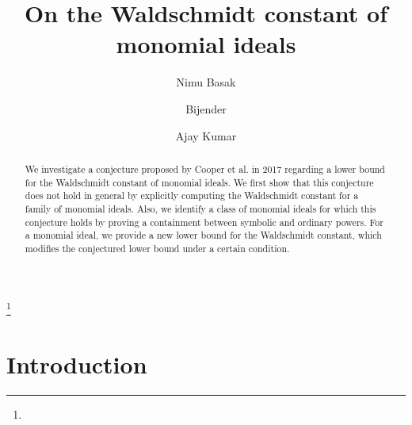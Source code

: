 \documentclass[12pt,reqno]{amsart}
\title[On the Waldschmidt constant of monomial ideals]{On the Waldschmidt constant of monomial ideals}
\author{}
\date{}
\theoremstyle{definition}
\numberwithin{equation}{section}
\begin{document}
\author[Nimu Basak]{Nimu Basak}
\address{Department of Mathematics, Indian Institute of Technology Jammu, Jammu \& Kashmir,     INDIA - 181221.}
	
\author[Bijender]{Bijender}
\address{Department of Mathematics, Delhi Technological University, Delhi, INDIA - 110042.}

\author[Ajay Kumar]{Ajay Kumar}
\address{Department of Mathematics, Indian Institute of Technology Jammu, Jammu \& Kashmir, INDIA - 181221.}


\thanks{}

  	

\begin{abstract}
    We investigate a conjecture proposed by Cooper et al. in 2017 regarding a lower bound for the Waldschmidt constant of monomial ideals. We first show that this conjecture does not hold in general by explicitly computing the Waldschmidt constant for a family of monomial ideals. Also, we identify a class of monomial ideals for which this conjecture holds by proving a containment between symbolic and ordinary powers. For a monomial ideal, we provide a new lower bound for the Waldschmidt constant, which modifies the conjectured lower bound under a certain condition.
\end{abstract}

\maketitle

\section{Introduction}\label{S-Introduction}
\end{document}
